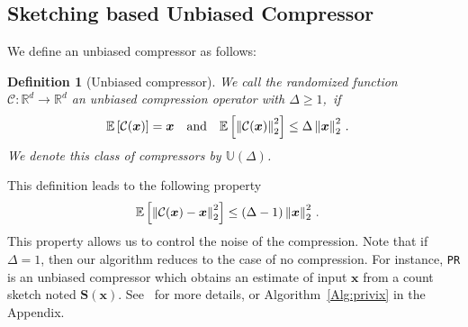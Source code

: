 \documentclass[sigconf, anonymous, review]{acmart}
\newtheorem{definition}{Definition}
\begin{document}
\subsection{Sketching based Unbiased Compressor}



We define an unbiased compressor as follows:
\begin{definition}[Unbiased compressor]\label{def:unbiased}
We call the randomized function $\mathcal{C}:\mathbb{R}^{d}\rightarrow\mathbb{R}^{d}$ an unbiased compression operator with $\Delta\geq 1$,~if
\begin{align}\notag
\mathbb{E}\left[\mathcal{C}(\boldsymbol{x})\right]&=\boldsymbol{x}\nonumber \quad \textrm{and} \quad    \mathbb{E}\left[\left\|\mathcal{C}(\boldsymbol{x})\right\|^2_2\right] \leq \Delta\left\|\boldsymbol{x}\right\|^2_2\notag \, .
\end{align}
We denote this class of compressors by $\mathbb{U}(\Delta)$.
\end{definition}
This definition leads to the following property 
\begin{align}\notag
    \mathbb{E}\left[\left\|\mathcal{C}(\boldsymbol{x})-\boldsymbol{x}\right\|^2_2\right]&\leq \left(\Delta-1\right)\left\|\boldsymbol{x}\right\|^2_2\, .
\end{align}
This property allows us to control the noise of the compression.
Note that if  $\Delta=1$, then our algorithm reduces to the case of no compression. 
For instance, \texttt{PR} is an unbiased compressor which obtains an estimate of input $\boldsymbol{x}$ from a count sketch noted $\boldsymbol{S}(\boldsymbol{x})$. See~\citep{li2019privacy} for more details, or Algorithm~\ref{Alg:privix} in the Appendix.
\end{document}
